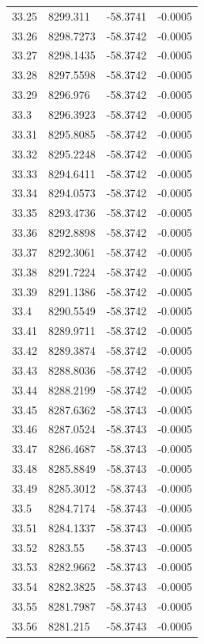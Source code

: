 \begin{table}[H]
\begin{tabular}{llll}
33.25 & 8299.311 & -58.3741 & -0.0005 \\
33.26 & 8298.7273 & -58.3742 & -0.0005 \\
33.27 & 8298.1435 & -58.3742 & -0.0005 \\
33.28 & 8297.5598 & -58.3742 & -0.0005 \\
33.29 & 8296.976 & -58.3742 & -0.0005 \\
33.3 & 8296.3923 & -58.3742 & -0.0005 \\
33.31 & 8295.8085 & -58.3742 & -0.0005 \\
33.32 & 8295.2248 & -58.3742 & -0.0005 \\
33.33 & 8294.6411 & -58.3742 & -0.0005 \\
33.34 & 8294.0573 & -58.3742 & -0.0005 \\
33.35 & 8293.4736 & -58.3742 & -0.0005 \\
33.36 & 8292.8898 & -58.3742 & -0.0005 \\
33.37 & 8292.3061 & -58.3742 & -0.0005 \\
33.38 & 8291.7224 & -58.3742 & -0.0005 \\
33.39 & 8291.1386 & -58.3742 & -0.0005 \\
33.4 & 8290.5549 & -58.3742 & -0.0005 \\
33.41 & 8289.9711 & -58.3742 & -0.0005 \\
33.42 & 8289.3874 & -58.3742 & -0.0005 \\
33.43 & 8288.8036 & -58.3742 & -0.0005 \\
33.44 & 8288.2199 & -58.3742 & -0.0005 \\
33.45 & 8287.6362 & -58.3743 & -0.0005 \\
33.46 & 8287.0524 & -58.3743 & -0.0005 \\
33.47 & 8286.4687 & -58.3743 & -0.0005 \\
33.48 & 8285.8849 & -58.3743 & -0.0005 \\
33.49 & 8285.3012 & -58.3743 & -0.0005 \\
33.5 & 8284.7174 & -58.3743 & -0.0005 \\
33.51 & 8284.1337 & -58.3743 & -0.0005 \\
33.52 & 8283.55 & -58.3743 & -0.0005 \\
33.53 & 8282.9662 & -58.3743 & -0.0005 \\
33.54 & 8282.3825 & -58.3743 & -0.0005 \\
33.55 & 8281.7987 & -58.3743 & -0.0005 \\
33.56 & 8281.215 & -58.3743 & -0.0005 \\

\end{tabular}
\end{table}
